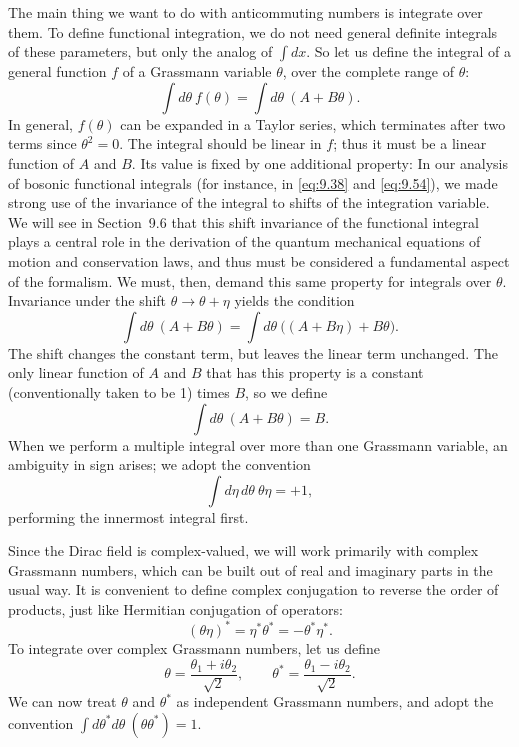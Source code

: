 The main thing we want to do with anticommuting numbers is integrate over
them.  To define functional integration, we do not need general definite
integrals of these parameters, but only the analog of $\int dx$.  So let us
define the integral of a general function $f$ of a Grassmann variable
$\theta$, over the complete range of $\theta$:
\begin{equation}
  \int d\theta\ f(\theta) = \int d\theta\ (A + B\theta) .
\end{equation}
In general, $f(\theta)$ can be expanded in a Taylor series, which terminates
after two terms since $\theta^2 = 0$.  The integral should be linear in $f$;
thus it must be a linear function of $A$ and $B$.  Its value is fixed by one
additional property: In our analysis of bosonic functional integrals (for
instance, in \eqref{eq:9.38} and \eqref{eq:9.54}), we made strong use of the
invariance of the integral to shifts of the integration variable.  We will see
in Section~9.6 that this shift invariance of the functional integral plays a
central role in the derivation of the quantum mechanical equations of motion
and conservation laws, and thus must be considered a fundamental aspect of the
formalism.  We must, then, demand this same property for integrals over
$\theta$.  Invariance under the shift $\theta\to\theta+\eta$ yields the
condition
\begin{equation}
  \int d\theta\ (A+B\theta) = \int d\theta\ \bigl( (A+B\eta) + B\theta \bigr) .
\end{equation}
The shift changes the constant term, but leaves the linear term unchanged.
The only linear function of $A$ and $B$ that has this property is a constant
(conventionally taken to be 1) times $B$, so we define
\begin{equation}
  \int d\theta\ (A + B\theta) = B .
  \label{eq:9.63}
\end{equation}
When we perform a multiple integral over more than one Grassmann variable, an
ambiguity in sign arises; we adopt the convention
\begin{equation}
  \int d\eta\,d\theta\ \theta\eta = +1 ,
  \label{eq:9.64}
\end{equation}
performing the innermost integral first.

Since the Dirac field is complex-valued, we will work primarily with complex
Grassmann numbers, which can be built out of real and imaginary parts in the
usual way.  It is convenient to define complex conjugation to reverse the
order of products, just like Hermitian conjugation of operators:
\begin{equation}
  (\theta\eta)^{*} = \eta^{*}\theta^{*} = -\theta^{*}\eta^{*} .
  \label{eq:9.65}
\end{equation}
To integrate over complex Grassmann numbers, let us define
\begin{equation}
  \theta = \frac{\theta_1 + i\theta_2}{\sqrt{2}},\qquad
  \theta^{*} = \frac{\theta_1 - i\theta_2}{\sqrt{2}} .
\end{equation}
We can now treat $\theta$ and $\theta^{*}$ as independent Grassmann numbers,
and adopt the convention $\int d\theta^{*}d\theta\ (\theta\theta^{*}) = 1$.

